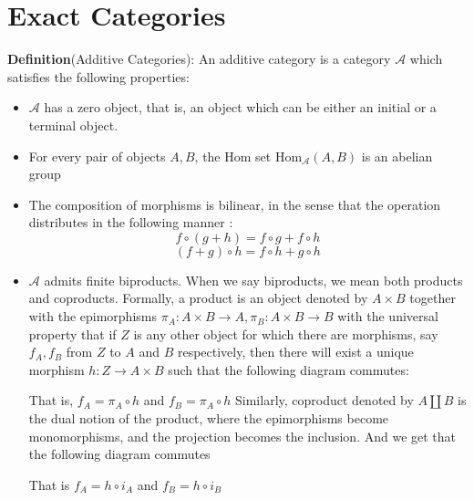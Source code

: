 \documentclass[12pt]{article}
\newcommand{\cat}[1]{\mathscr{#1}}
\begin{document}
\section*{Exact Categories}
\textbf{Definition}(Additive Categories): An additive category is a category $\cat{A}$ which satisfies the following properties: 
\begin{itemize}
    \item $\cat{A}$ has a zero object, that is, an object which can be either an initial or a terminal object.
    \item For every pair of objects $A,B$, the Hom set Hom$_\cat{A}(A,B)$ is an abelian group 
    \item The composition of morphisms is bilinear, in the sense that the operation distributes in the following manner :
    \[
    f \circ (g+h)=f\circ g + f \circ h
    \]
    \[
    (f + g) \circ h=f \circ h + g\circ h
    \]
    \item $\cat{A}$ admits finite biproducts. When we say biproducts, we mean both products and coproducts. Formally, a product is an object denoted by $A \times B$ together with the epimorphisms $\pi_A:A\times B \to A, \pi_B:A \times B \to B $ with the universal property that if $Z$ is any other object for which there are morphisms, say $f_A, f_B$ from $Z$ to $A$ and $B$ respectively, then there will exist a unique morphism $h: Z \to A \times B$ such that the following diagram commutes:

        
    \begin{center}
    \end{center}
    That is, $f_A= \pi_A \circ h$ and $f_B =\pi_A \circ h$
    Similarly, coproduct denoted by $A \coprod B$ is the dual notion of the product, where the epimorphisms become monomorphisms, and the projection becomes the inclusion. And we get that the following diagram commutes
            \begin{center}
    \end{center}
    That is $f_A= h \circ i_A$ and $f_B=h \circ i_B$
\end{itemize}
\end{document}

